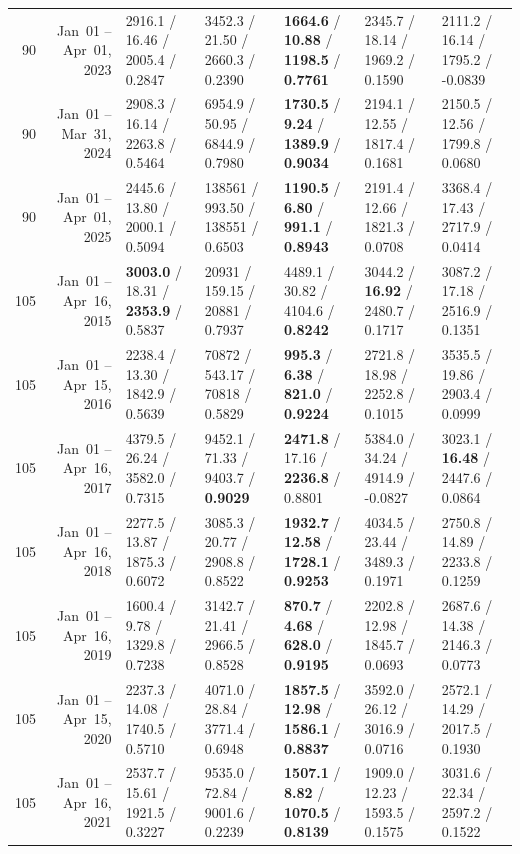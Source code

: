 \begin{longtable}{r r l l l l l}
90 & Jan~01 -- Apr~01, 2023 & 2916.1 / 16.46 / 2005.4 / 0.2847 & 3452.3 / 21.50 / 2660.3 / 0.2390 & \textbf{1664.6} / \textbf{10.88} / \textbf{1198.5} / \textbf{0.7761} & 2345.7 / 18.14 / 1969.2 / 0.1590 & 2111.2 / 16.14 / 1795.2 / -0.0839 \\
90 & Jan~01 -- Mar~31, 2024 & 2908.3 / 16.14 / 2263.8 / 0.5464 & 6954.9 / 50.95 / 6844.9 / 0.7980 & \textbf{1730.5} / \textbf{9.24} / \textbf{1389.9} / \textbf{0.9034} & 2194.1 / 12.55 / 1817.4 / 0.1681 & 2150.5 / 12.56 / 1799.8 / 0.0680 \\
90 & Jan~01 -- Apr~01, 2025 & 2445.6 / 13.80 / 2000.1 / 0.5094 & 138561 / 993.50 / 138551 / 0.6503 & \textbf{1190.5} / \textbf{6.80} / \textbf{991.1} / \textbf{0.8943} & 2191.4 / 12.66 / 1821.3 / 0.0708 & 3368.4 / 17.43 / 2717.9 / 0.0414 \\
\midrule
105 & Jan~01 -- Apr~16, 2015 & \textbf{3003.0} / 18.31 / \textbf{2353.9} / 0.5837 & 20931 / 159.15 / 20881 / 0.7937 & 4489.1 / 30.82 / 4104.6 / \textbf{0.8242} & 3044.2 / \textbf{16.92} / 2480.7 / 0.1717 & 3087.2 / 17.18 / 2516.9 / 0.1351 \\
105 & Jan~01 -- Apr~15, 2016 & 2238.4 / 13.30 / 1842.9 / 0.5639 & 70872 / 543.17 / 70818 / 0.5829 & \textbf{995.3} / \textbf{6.38} / \textbf{821.0} / \textbf{0.9224} & 2721.8 / 18.98 / 2252.8 / 0.1015 & 3535.5 / 19.86 / 2903.4 / 0.0999 \\
105 & Jan~01 -- Apr~16, 2017 & 4379.5 / 26.24 / 3582.0 / 0.7315 & 9452.1 / 71.33 / 9403.7 / \textbf{0.9029} & \textbf{2471.8} / 17.16 / \textbf{2236.8} / 0.8801 & 5384.0 / 34.24 / 4914.9 / -0.0827 & 3023.1 / \textbf{16.48} / 2447.6 / 0.0864 \\
105 & Jan~01 -- Apr~16, 2018 & 2277.5 / 13.87 / 1875.3 / 0.6072 & 3085.3 / 20.77 / 2908.8 / 0.8522 & \textbf{1932.7} / \textbf{12.58} / \textbf{1728.1} / \textbf{0.9253} & 4034.5 / 23.44 / 3489.3 / 0.1971 & 2750.8 / 14.89 / 2233.8 / 0.1259 \\
105 & Jan~01 -- Apr~16, 2019 & 1600.4 / 9.78 / 1329.8 / 0.7238 & 3142.7 / 21.41 / 2966.5 / 0.8528 & \textbf{870.7} / \textbf{4.68} / \textbf{628.0} / \textbf{0.9195} & 2202.8 / 12.98 / 1845.7 / 0.0693 & 2687.6 / 14.38 / 2146.3 / 0.0773 \\
105 & Jan~01 -- Apr~15, 2020 & 2237.3 / 14.08 / 1740.5 / 0.5710 & 4071.0 / 28.84 / 3771.4 / 0.6948 & \textbf{1857.5} / \textbf{12.98} / \textbf{1586.1} / \textbf{0.8837} & 3592.0 / 26.12 / 3016.9 / 0.0716 & 2572.1 / 14.29 / 2017.5 / 0.1930 \\
105 & Jan~01 -- Apr~16, 2021 & 2537.7 / 15.61 / 1921.5 / 0.3227 & 9535.0 / 72.84 / 9001.6 / 0.2239 & \textbf{1507.1} / \textbf{8.82} / \textbf{1070.5} / \textbf{0.8139} & 1909.0 / 12.23 / 1593.5 / 0.1575 & 3031.6 / 22.34 / 2597.2 / 0.1522 \\

\end{longtable}
